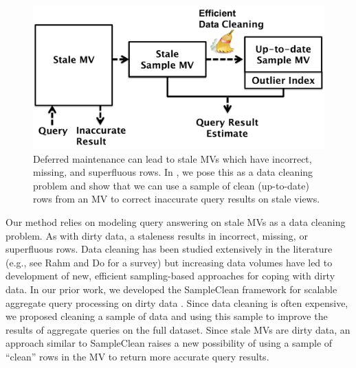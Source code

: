 
\begin{figure}[t] \vspace{-2em}
\centering
 \includegraphics[scale=0.25]{figs/sys-arch.pdf} \vspace{-.25em}
 \caption{Deferred maintenance can lead to stale MVs which have incorrect, missing, and superfluous rows. In \svc, we pose this as a data cleaning problem and show that we can use a sample of clean (up-to-date) rows from an MV to correct inaccurate query results on stale views.\label{sys-arch}}\vspace{-1.75em}
\end{figure}

Our method relies on modeling query answering on stale MVs as a data cleaning problem.
As with dirty data, a staleness results in incorrect, missing, or superfluous rows.
Data cleaning has been studied extensively in the literature (e.g., see Rahm and Do for a survey\cite{rahm2000data}) but increasing data volumes have led to development of new, efficient sampling-based approaches for coping with dirty data.   
In our prior work, we developed the SampleClean framework for scalable aggregate query processing on dirty data \cite{wang1999sample}.
Since data cleaning is often expensive, we proposed cleaning a sample of data and using this sample to improve the results of aggregate queries on the full dataset.
Since stale MVs are dirty data, an approach similar to SampleClean raises a new possibility of using a sample of ``clean'' rows in the MV to return more accurate query results.

